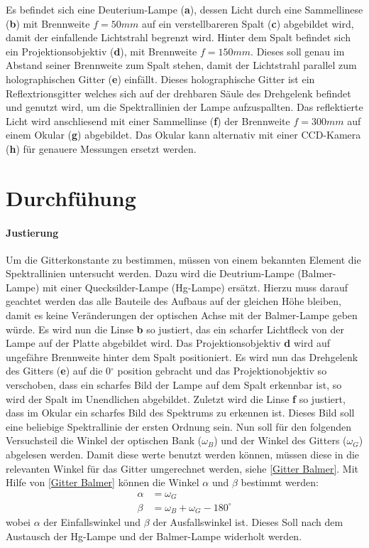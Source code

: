 Es befindet sich eine Deuterium-Lampe (\textbf{a}), dessen Licht durch eine Sammellinese (\textbf{b}) mit Brennweite $f = 50mm$ auf ein verstellbareren Spalt (\textbf{c}) abgebildet wird, damit der einfallende Lichtstrahl begrenzt wird. 
Hinter dem Spalt befindet sich ein Projektionsobjektiv (\textbf{d}), mit Brennweite $f = 150mm$. 
Dieses soll genau im Abstand seiner Brennweite zum Spalt stehen, damit der Lichtstrahl parallel zum holographischen Gitter (\textbf{e}) einfällt. 
Dieses holographische Gitter ist ein Reflextrionsgitter welches sich auf der drehbaren Säule des Drehgelenk befindet und genutzt wird, um die Spektrallinien der Lampe aufzuspallten. 
Das reflektierte Licht wird anschliesend mit einer Sammellinse (\textbf{f}) der Brennweite $f=300mm$ auf einem Okular (\textbf{g}) abgebildet.
Das Okular kann alternativ mit einer CCD-Kamera (\textbf{h}) für genauere Messungen ersetzt werden.

\section{Durchfühung}

\paragraph{Justierung}

Um die Gitterkonstante zu bestimmen, müssen von einem bekannten Element die Spektrallinien untersucht werden. 
Dazu wird die Deutrium-Lampe (Balmer-Lampe) mit einer Quecksilder-Lampe (Hg-Lampe) ersätzt. 
Hierzu muss darauf geachtet werden das alle Bauteile des Aufbaus auf der gleichen Höhe bleiben, damit es keine Veränderungen der optischen Achse mit der Balmer-Lampe geben würde.
Es wird nun die Linse \textbf{b} so justiert, das ein scharfer Lichtfleck von der Lampe auf der Platte abgebildet wird.
Das Projektionsobjektiv \textbf{d} wird auf ungefähre Brennweite hinter dem Spalt positioniert. 
Es wird nun das Drehgelenk des Gitters (\textbf{e}) auf die 0$^\circ$ position gebracht und das Projektionobjektiv so verschoben, dass ein scharfes Bild der Lampe auf dem Spalt erkennbar ist, so wird der Spalt im Unendlichen abgebildet.
Zuletzt wird die Linse \textbf{f} so justiert, dass im Okular ein scharfes Bild des Spektrums zu erkennen ist. Dieses Bild soll eine beliebige Spektrallinie der ersten Ordnung sein.
Nun soll für den folgenden Versuchsteil die Winkel der optischen Bank ($\omega_B$) und der Winkel des Gitters ($\omega_G$) abgelesen werden.  
Damit diese werte benutzt werden können, müssen diese in die relevanten Winkel für das Gitter umgerechnet werden, siehe \cref{Gitter Balmer}. 
Mit Hilfe von \cref{Gitter Balmer} können die Winkel $\alpha$ und $\beta$ bestimmt werden: 
\begin{align}
    \alpha &= \omega_G \\  \beta &= \omega_B + \omega_G - 180^\circ 
    \label{Gitter Balmer}
\end{align}
wobei $\alpha$ der Einfallswinkel und $\beta$ der Ausfallswinkel ist.
Dieses Soll nach dem Austausch der Hg-Lampe und der Balmer-Lampe widerholt werden. 


